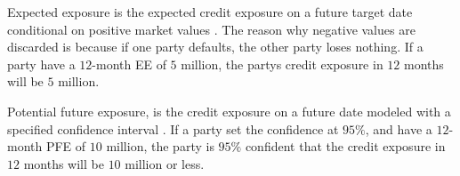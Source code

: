 \newpage

Expected exposure is the expected credit exposure on a future target date conditional on positive market values \cite{investopedia_understanding_counterparty_risk}. The reason why negative values are discarded is because if one party defaults, the other party loses nothing. If a party have a $12$-month EE of $5$ million, the partys credit exposure in $12$ months will be $5$ million.




Potential future exposure, is the credit exposure on a future date modeled with a specified confidence interval \cite{investopedia_understanding_counterparty_risk}. If a party set the confidence at $95\%$, and have a $12$-month PFE of $10$ million, the party is $95\%$ confident that the credit exposure in $12$ months will be $10$ million or less.

